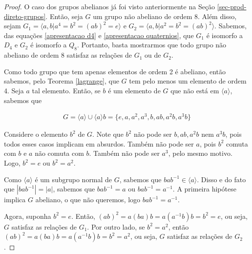 	\begin{proof}
		O caso dos grupos abelianos já foi visto anteriormente na Seção \ref{sec-prod-direto-grupos}. Então, seja $G$ um grupo não abeliano de ordem 8. Além disso, sejam $G_1 = \langle a,b | a^4 = b^2 =(ab)^2 = e \rangle$ e $G_2 = \langle a,b | a^2 = b^2 = (ab)^2 \rangle$. Sabemos, das equações \eqref{apresentacao d4} e \eqref{apresentacao quaternios}, que $G_1$ é isomorfo a $D_4$ e $G_2$ é isomorfo a $Q_8$. Portanto, basta mostrarmos que todo grupo não abeliano de ordem 8 satisfaz as relações de $G_1$ ou de $G_2$. 
		
		\par\vspace{0.3cm} Como todo grupo que tem apenas elementos de ordem 2 é abeliano, %
		então sabemos, pelo Teorema \eqref{lagrange}, que $G$ tem pelo menos um elemento de ordem 4. Seja $a$ tal elemento. Então, se $b$ é um elemento de $G$ que não está em $\langle a \rangle$, sabemos que 
		
		\begin{align*}
		G = \langle a \rangle\cup\langle a \rangle b = \{e, a, a^2, a^3, b, ab, a^2b, a^3b\}
		\end{align*}
		
		\par\vspace{0.3cm} Considere o elemento $b^2$ de $G$. Note que $b^2$ não pode ser $b, ab, a^2b$ nem $a^3b$, pois todos esses casos implicam em absurdos. Também não pode ser $a$, pois $b^2$ comuta com $b$ e $a$ não comuta com $b$. Também não pode ser $a^3$, pelo mesmo motivo. Logo, $b^2 = e$ ou $b^2 = a^2$. 
		
		\par\vspace{0.3cm} Como $\langle a \rangle$ é um subgrupo normal de $G$, sabemos que $bab^{-1}\in\langle a \rangle$. Disso e do fato que $|bab^{-1}| = |a|$, sabemos que $bab^{-1} = a$ ou $bab^{-1} = a^{-1}$. A primeira hipótese implica $G$ abeliano, o que não queremos, logo $bab^{-1} = a^{-1}$.
		
		\par\vspace{0.3cm} Agora, suponha $b^2 = e$. Então, $(ab)^2 = a(ba)b = a(a^{-1}b)b = b^2 = e$, ou seja, $G$ satisfaz as relações de $G_1$. Por outro lado, se $b^2 = a^2$, então $(ab)^2 = a(ba)b = a(a^{-1}b)b = b^2 = a^2$, ou seja, $G$ satisfaz as relações de $G_2$. 
		
	\end{proof}
	
